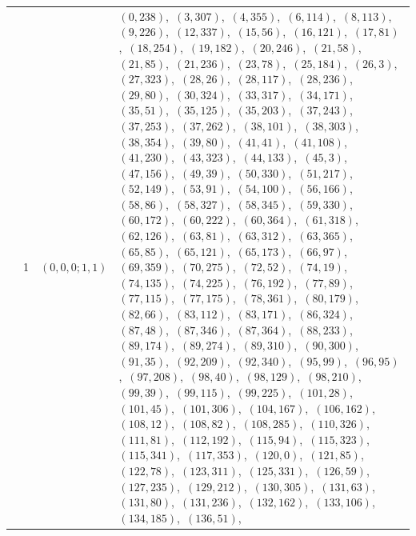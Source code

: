\documentclass[11pt]{article}
\begin{document}
\begin{longtable}{@{}rrl>{\raggedright\arraybackslash}p{}@{}}
\addlinespace[3pt]
379 & 1 & $(0,0,0;1,1)$ & $(0,238)$,\allowbreak\ $(3,307)$,\allowbreak\ $(4,355)$,\allowbreak\ $(6,114)$,\allowbreak\ $(8,113)$,\allowbreak\ $(9,226)$,\allowbreak\ $(12,337)$,\allowbreak\ $(15,56)$,\allowbreak\ $(16,121)$,\allowbreak\ $(17,81)$,\allowbreak\ $(18,254)$,\allowbreak\ $(19,182)$,\allowbreak\ $(20,246)$,\allowbreak\ $(21,58)$,\allowbreak\ $(21,85)$,\allowbreak\ $(21,236)$,\allowbreak\ $(23,78)$,\allowbreak\ $(25,184)$,\allowbreak\ $(26,3)$,\allowbreak\ $(27,323)$,\allowbreak\ $(28,26)$,\allowbreak\ $(28,117)$,\allowbreak\ $(28,236)$,\allowbreak\ $(29,80)$,\allowbreak\ $(30,324)$,\allowbreak\ $(33,317)$,\allowbreak\ $(34,171)$,\allowbreak\ $(35,51)$,\allowbreak\ $(35,125)$,\allowbreak\ $(35,203)$,\allowbreak\ $(37,243)$,\allowbreak\ $(37,253)$,\allowbreak\ $(37,262)$,\allowbreak\ $(38,101)$,\allowbreak\ $(38,303)$,\allowbreak\ $(38,354)$,\allowbreak\ $(39,80)$,\allowbreak\ $(41,41)$,\allowbreak\ $(41,108)$,\allowbreak\ $(41,230)$,\allowbreak\ $(43,323)$,\allowbreak\ $(44,133)$,\allowbreak\ $(45,3)$,\allowbreak\ $(47,156)$,\allowbreak\ $(49,39)$,\allowbreak\ $(50,330)$,\allowbreak\ $(51,217)$,\allowbreak\ $(52,149)$,\allowbreak\ $(53,91)$,\allowbreak\ $(54,100)$,\allowbreak\ $(56,166)$,\allowbreak\ $(58,86)$,\allowbreak\ $(58,327)$,\allowbreak\ $(58,345)$,\allowbreak\ $(59,330)$,\allowbreak\ $(60,172)$,\allowbreak\ $(60,222)$,\allowbreak\ $(60,364)$,\allowbreak\ $(61,318)$,\allowbreak\ $(62,126)$,\allowbreak\ $(63,81)$,\allowbreak\ $(63,312)$,\allowbreak\ $(63,365)$,\allowbreak\ $(65,85)$,\allowbreak\ $(65,121)$,\allowbreak\ $(65,173)$,\allowbreak\ $(66,97)$,\allowbreak\ $(69,359)$,\allowbreak\ $(70,275)$,\allowbreak\ $(72,52)$,\allowbreak\ $(74,19)$,\allowbreak\ $(74,135)$,\allowbreak\ $(74,225)$,\allowbreak\ $(76,192)$,\allowbreak\ $(77,89)$,\allowbreak\ $(77,115)$,\allowbreak\ $(77,175)$,\allowbreak\ $(78,361)$,\allowbreak\ $(80,179)$,\allowbreak\ $(82,66)$,\allowbreak\ $(83,112)$,\allowbreak\ $(83,171)$,\allowbreak\ $(86,324)$,\allowbreak\ $(87,48)$,\allowbreak\ $(87,346)$,\allowbreak\ $(87,364)$,\allowbreak\ $(88,233)$,\allowbreak\ $(89,174)$,\allowbreak\ $(89,274)$,\allowbreak\ $(89,310)$,\allowbreak\ $(90,300)$,\allowbreak\ $(91,35)$,\allowbreak\ $(92,209)$,\allowbreak\ $(92,340)$,\allowbreak\ $(95,99)$,\allowbreak\ $(96,95)$,\allowbreak\ $(97,208)$,\allowbreak\ $(98,40)$,\allowbreak\ $(98,129)$,\allowbreak\ $(98,210)$,\allowbreak\ $(99,39)$,\allowbreak\ $(99,115)$,\allowbreak\ $(99,225)$,\allowbreak\ $(101,28)$,\allowbreak\ $(101,45)$,\allowbreak\ $(101,306)$,\allowbreak\ $(104,167)$,\allowbreak\ $(106,162)$,\allowbreak\ $(108,12)$,\allowbreak\ $(108,82)$,\allowbreak\ $(108,285)$,\allowbreak\ $(110,326)$,\allowbreak\ $(111,81)$,\allowbreak\ $(112,192)$,\allowbreak\ $(115,94)$,\allowbreak\ $(115,323)$,\allowbreak\ $(115,341)$,\allowbreak\ $(117,353)$,\allowbreak\ $(120,0)$,\allowbreak\ $(121,85)$,\allowbreak\ $(122,78)$,\allowbreak\ $(123,311)$,\allowbreak\ $(125,331)$,\allowbreak\ $(126,59)$,\allowbreak\ $(127,235)$,\allowbreak\ $(129,212)$,\allowbreak\ $(130,305)$,\allowbreak\ $(131,63)$,\allowbreak\ $(131,80)$,\allowbreak\ $(131,236)$,\allowbreak\ $(132,162)$,\allowbreak\ $(133,106)$,\allowbreak\ $(134,185)$,\allowbreak\ $(136,51)$,\allowbreak\ 
\end{longtable}
\end{document}
